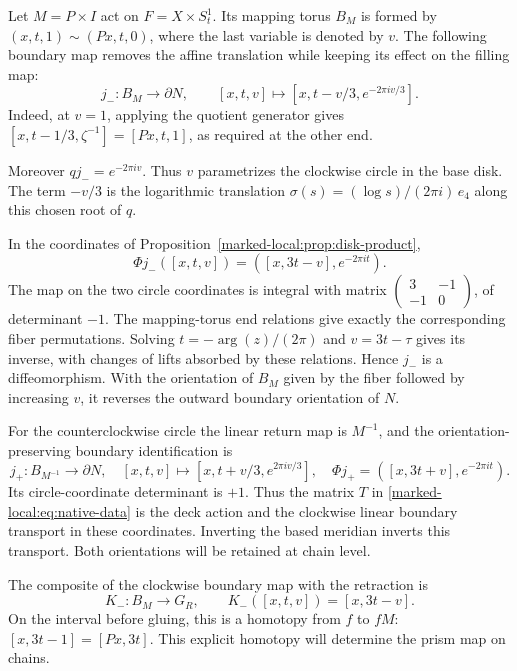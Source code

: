 Let $M=P\times I$ act on $F=X\times S^1_t$.
Its mapping torus $B_M$ is formed by
$(x,t,1)\sim(Px,t,0)$, where the last variable is denoted by $v$.
The following boundary map removes the affine translation while keeping
its effect on the filling map:
\begin{equation}\label{marked-local:eq:clockwise-boundary}
 j_-:B_M\longrightarrow\partial N,
 \qquad [x,t,v]\longmapsto
       [x,t-v/3,e^{-2\pi iv/3}].
\end{equation}
Indeed, at $v=1$, applying the quotient generator gives
$[x,t-1/3,\zeta^{-1}]=[Px,t,1]$, as required at the other end.

Moreover $qj_-=e^{-2\pi iv}$. Thus $v$ parametrizes the clockwise
circle in the base disk. The term $-v/3$ is the logarithmic translation
$\sigma(s)=(\log s)/(2\pi i)\,e_4$ along this chosen root of $q$.

In the coordinates of Proposition~\ref{marked-local:prop:disk-product},
\begin{equation}\label{marked-local:eq:boundary-product}
       \Phi j_-([x,t,v])=([x,3t-v],e^{-2\pi it}).
\end{equation}
The map on the two circle coordinates is integral with matrix
$\left(\begin{smallmatrix}3&-1\\-1&0\end{smallmatrix}\right)$,
of determinant $-1$. The mapping-torus end relations give exactly the
corresponding fiber permutations. Solving $t=-\arg(z)/(2\pi)$ and
$v=3t-\tau$ gives its inverse, with changes of lifts absorbed by
these relations. Hence $j_-$ is a diffeomorphism. With the orientation
of $B_M$ given by the fiber followed by increasing $v$, it reverses
the outward boundary orientation of $N$.

For the counterclockwise circle the linear return map is $M^{-1}$,
and the orientation-preserving boundary identification is
\begin{equation}\label{marked-local:eq:counterclockwise-boundary}
 j_+:B_{M^{-1}}\longrightarrow\partial N,
 \quad [x,t,v]\longmapsto[x,t+v/3,e^{2\pi iv/3}],
 \quad \Phi j_+=([x,3t+v],e^{-2\pi it}).
\end{equation}
Its circle-coordinate determinant is $+1$.
Thus the matrix $T$ in \eqref{marked-local:eq:native-data} is the deck action
and the clockwise linear boundary transport in these coordinates.
Inverting the based meridian inverts this transport. Both orientations
will be retained at chain level.

The composite of the clockwise boundary map with the retraction is
\begin{equation}\label{marked-local:eq:actual-prism}
 K_-:B_M\longrightarrow G_R,
 \qquad K_-([x,t,v])=[x,3t-v].
\end{equation}
On the interval before gluing, this is a homotopy from $f$ to $fM$:
$[x,3t-1]=[Px,3t]$. This explicit homotopy will determine the
prism map on chains.

